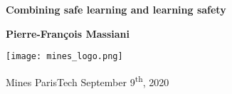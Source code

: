 \begin{titlepage}
   \begin{center}
       \vspace*{1cm}

       \textbf{Combining safe learning and learning safety}

       \vspace{0.5cm}
            
       \vspace{1.5cm}

       \textbf{Pierre-François Massiani}

       \vfill
       \vspace{0.8cm}
     
       \texttt{[image: mines\_logo.png]}
       
       Mines ParisTech
       September 9\textsuperscript{th}, 2020
            
   \end{center}
\end{titlepage}